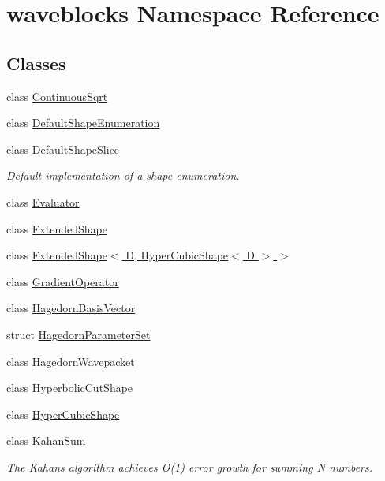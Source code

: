 \hypertarget{namespacewaveblocks}{}\section{waveblocks Namespace Reference}
\label{namespacewaveblocks}
\subsection*{Classes}
\begin{DoxyCompactItemize}
\item 
class \hyperlink{classwaveblocks_1_1_continuous_sqrt}{Continuous\+Sqrt}
\item 
class \hyperlink{classwaveblocks_1_1_default_shape_enumeration}{Default\+Shape\+Enumeration}
\item 
class \hyperlink{classwaveblocks_1_1_default_shape_slice}{Default\+Shape\+Slice}
\begin{DoxyCompactList}\small\item\em Default implementation of a shape enumeration. \end{DoxyCompactList}\item 
class \hyperlink{classwaveblocks_1_1_evaluator}{Evaluator}
\item 
class \hyperlink{classwaveblocks_1_1_extended_shape}{Extended\+Shape}
\item 
class \hyperlink{classwaveblocks_1_1_extended_shape_3_01_d_00_01_hyper_cubic_shape_3_01_d_01_4_01_4}{Extended\+Shape$<$ D, Hyper\+Cubic\+Shape$<$ D $>$ $>$}
\item 
class \hyperlink{classwaveblocks_1_1_gradient_operator}{Gradient\+Operator}
\item 
class \hyperlink{classwaveblocks_1_1_hagedorn_basis_vector}{Hagedorn\+Basis\+Vector}
\item 
struct \hyperlink{structwaveblocks_1_1_hagedorn_parameter_set}{Hagedorn\+Parameter\+Set}
\item 
class \hyperlink{classwaveblocks_1_1_hagedorn_wavepacket}{Hagedorn\+Wavepacket}
\item 
class \hyperlink{classwaveblocks_1_1_hyperbolic_cut_shape}{Hyperbolic\+Cut\+Shape}
\item 
class \hyperlink{classwaveblocks_1_1_hyper_cubic_shape}{Hyper\+Cubic\+Shape}
\item 
class \hyperlink{classwaveblocks_1_1_kahan_sum}{Kahan\+Sum}
\begin{DoxyCompactList}\small\item\em The Kahan\textquotesingle{}s algorithm achieves O(1) error growth for summing N numbers. \end{DoxyCompactList}\item 

\end{DoxyCompactItemize}
